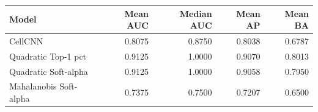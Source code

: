 \begin{tabular}{lrrrr}
\toprule
Model & Mean AUC & Median AUC & Mean AP & Mean BA \\
\midrule
CellCNN & 0.8075 & 0.8750 & 0.8038 & 0.6787 \\
Quadratic Top-1 pct & 0.9125 & 1.0000 & 0.9070 & 0.8013 \\
Quadratic Soft-alpha & 0.9125 & 1.0000 & 0.9058 & 0.7950 \\
Mahalanobis Soft-alpha & 0.7375 & 0.7500 & 0.7207 & 0.6500 \\
\bottomrule
\end{tabular}
